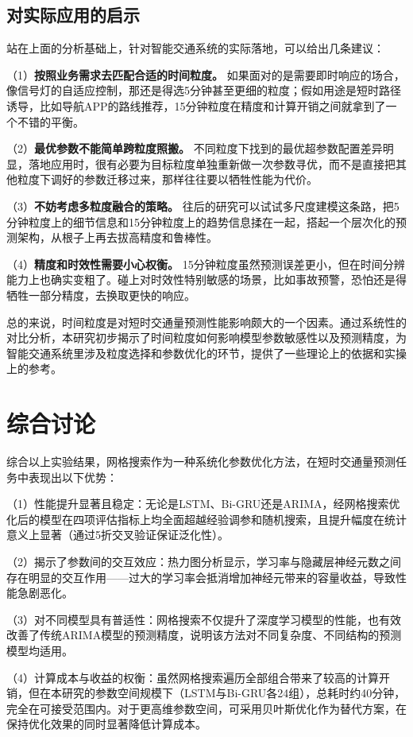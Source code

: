 \documentclass[12pt,a4paper,oneside]{ctexbook}
\begin{document}
	\subsection{对实际应用的启示}
	
	站在上面的分析基础上，针对智能交通系统的实际落地，可以给出几条建议：
	
	（1）\textbf{按照业务需求去匹配合适的时间粒度。} 如果面对的是需要即时响应的场合，像信号灯的自适应控制，那还是得选5分钟甚至更细的粒度；假如用途是短时路径诱导，比如导航APP的路线推荐，15分钟粒度在精度和计算开销之间就拿到了一个不错的平衡。
	
	（2）\textbf{最优参数不能简单跨粒度照搬。} 不同粒度下找到的最优超参数配置差异明显，落地应用时，很有必要为目标粒度单独重新做一次参数寻优，而不是直接把其他粒度下调好的参数迁移过来，那样往往要以牺牲性能为代价。
	
	（3）\textbf{不妨考虑多粒度融合的策略。} 往后的研究可以试试多尺度建模这条路，把5分钟粒度上的细节信息和15分钟粒度上的趋势信息揉在一起，搭起一个层次化的预测架构，从根子上再去拔高精度和鲁棒性。
	
	（4）\textbf{精度和时效性需要小心权衡。} 15分钟粒度虽然预测误差更小，但在时间分辨能力上也确实变粗了。碰上对时效性特别敏感的场景，比如事故预警，恐怕还是得牺牲一部分精度，去换取更快的响应。
	
	总的来说，时间粒度是对短时交通量预测性能影响颇大的一个因素。通过系统性的对比分析，本研究初步揭示了时间粒度如何影响模型参数敏感性以及预测精度，为智能交通系统里涉及粒度选择和参数优化的环节，提供了一些理论上的依据和实操上的参考。
	
	\section{综合讨论}
	
	综合以上实验结果，网格搜索作为一种系统化参数优化方法，在短时交通量预测任务中表现出以下优势：
	
	（1）性能提升显著且稳定：无论是LSTM、Bi-GRU还是ARIMA，经网格搜索优化后的模型在四项评估指标上均全面超越经验调参和随机搜索，且提升幅度在统计意义上显著（通过5折交叉验证保证泛化性）。
	
	（2）揭示了参数间的交互效应：热力图分析显示，学习率与隐藏层神经元数之间存在明显的交互作用——过大的学习率会抵消增加神经元带来的容量收益，导致性能急剧恶化。
	
	（3）对不同模型具有普适性：网格搜索不仅提升了深度学习模型的性能，也有效改善了传统ARIMA模型的预测精度，说明该方法对不同复杂度、不同结构的预测模型均适用。
	
	（4）计算成本与收益的权衡：虽然网格搜索遍历全部组合带来了较高的计算开销，但在本研究的参数空间规模下（LSTM与Bi-GRU各24组），总耗时约40分钟，完全在可接受范围内。对于更高维参数空间，可采用贝叶斯优化作为替代方案，在保持优化效果的同时显著降低计算成本。
	
\end{document}
